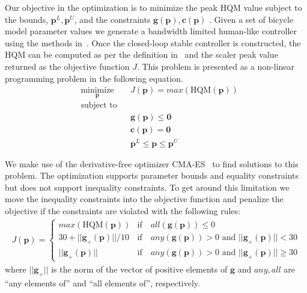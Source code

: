 \documentclass{bmd2019p}
\begin{document}
Our objective in the optimization is to minimize the peak HQM value subject to
the bounds, $\mathbf{p}^L,\mathbf{p}^U$, and the constraints
$\mathbf{g}(\mathbf{p}),\mathbf{c}(\mathbf{p})$ . Given a set of bicycle model
parameter values we generate a bandwidth limited human-like controller using
the methods in~\cite{Moore2012}. Once the closed-loop stable controller is
constructed, the HQM can be computed as per the definition in~\cite{Hess2012}
and the scaler peak value returned as the objective function $J$. This problem
is presented as a non-linear programming problem in the following equation.
%
\begin{equation}
  \begin{aligned}
    & \underset{\mathbf{p}}{\text{minimize}} & & J(\mathbf{p})=max(\textrm{HQM}(\mathbf{p})) \\
    & \text{subject to} & & \\
    & & & \mathbf{g}(\mathbf{p}) \leq \mathbf{0} \\
    & & & \mathbf{c}(\mathbf{p}) = \mathbf{0} \\
    & & & \mathbf{p}^L \leq \mathbf{p} \leq \mathbf{p}^U
  \end{aligned}
\end{equation}

We make use of the derivative-free optimizer CMA-ES~\cite{Hansen1996} to find
solutions to this problem. The optimization supports parameter bounds and
equality constraints but does not support inequality constraints. To get around
this limitation we move the inequality constraints into the objective function
and penalize the objective if the constraints are violated with the following
rules:
%
\begin{align}
  J(\mathbf{p}) =
  \begin{cases}
    max(\textrm{HQM}(\mathbf{p})) & \textrm{if} \quad all(\mathbf{g}(\mathbf{p})) \leq 0 \\
    30 + ||\mathbf{g}_{+}(\mathbf{p})||/10 & \textrm{if} \quad
      any(\mathbf{g}(\mathbf{p})) > 0 \textrm{ and } ||\mathbf{g}_{+}(\mathbf{p})|| < 30 \\
    ||\mathbf{g}_{+}(\mathbf{p})|| & \textrm{if} \quad
      any(\mathbf{g}(\mathbf{p})) > 0 \textrm{ and } ||\mathbf{g}_{+}(\mathbf{p})|| \geq 30
  \end{cases}
\end{align}
where $||\mathbf{g}_{+}||$ is the norm of the vector of positive elements of
$\mathbf{g}$ and $any,all$ are ``any elements of'' and ``all elements of'',
respectively.
\end{document}
